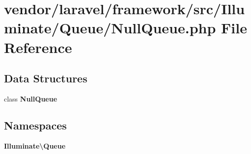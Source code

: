 \section{vendor/laravel/framework/src/\+Illuminate/\+Queue/\+Null\+Queue.php File Reference}
\label{_null_queue_8php}
\subsection*{Data Structures}
\begin{DoxyCompactItemize}
\item 
class {\bf Null\+Queue}
\end{DoxyCompactItemize}
\subsection*{Namespaces}
\begin{DoxyCompactItemize}
\item 
 {\bf Illuminate\textbackslash{}\+Queue}
\end{DoxyCompactItemize}
